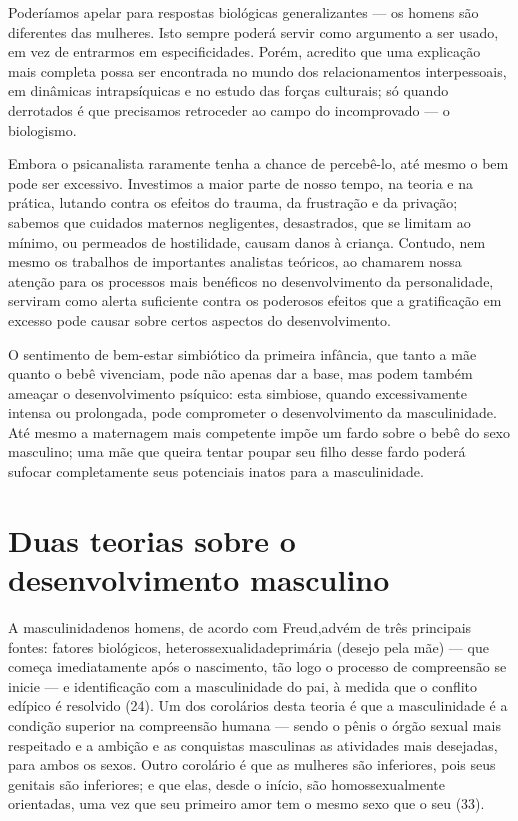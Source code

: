 Poderíamos apelar para respostas biológicas generalizantes --- os
homens são diferentes das mulheres. Isto sempre poderá servir como
argumento a ser usado, em vez de entrarmos em especificidades. Porém,
acredito que uma explicação mais completa possa ser encontrada no mundo
dos relacionamentos interpessoais, em dinâmicas intrapsíquicas e no
estudo das forças culturais; só quando derrotados é que precisamos
retroceder ao campo do incomprovado --- o biologismo.

Embora o psicanalista raramente tenha a chance de percebê-lo, até
mesmo o bem pode ser excessivo. Investimos a maior parte de nosso
tempo, na teoria e na prática, lutando contra os efeitos do trauma, da
frustração e da privação; sabemos que cuidados maternos negligentes,
desastrados, que se limitam ao mínimo, ou permeados de hostilidade,
causam danos à criança. Contudo, nem mesmo os trabalhos de importantes
analistas teóricos, ao chamarem nossa atenção para os processos mais
benéficos no desenvolvimento da personalidade, serviram como alerta
suficiente contra os poderosos efeitos que a gratificação em excesso
pode causar sobre certos aspectos do desenvolvimento.

O sentimento de bem-estar simbiótico da primeira infância, que tanto
a mãe quanto o bebê vivenciam, pode não apenas dar a base, mas podem
também ameaçar o desenvolvimento psíquico: esta simbiose, quando
excessivamente intensa ou prolongada, pode comprometer o
desenvolvimento da masculinidade. Até mesmo a maternagem mais
competente impõe um fardo sobre o bebê do sexo masculino; uma mãe\idxmaes{} que
queira tentar poupar seu filho desse fardo poderá sufocar completamente
seus potenciais inatos para a masculinidade.


\section{Duas teorias sobre o desenvolvimento masculino}

A masculinidade\idxmascu[|(] nos homens, de acordo com Freud,\idxfreudmascu[|(] advém de três
principais fontes: fatores biológicos, heterossexualidade\idxheteroprim[|(] primária
(desejo pela mãe) --- que começa imediatamente após o nascimento, tão
logo o processo de compreensão se inicie --- e identificação\idxident{} com a
masculinidade do pai, à medida que o conflito edípico é resolvido
(24). Um dos corolários desta teoria é que a masculinidade é a condição
superior na compreensão humana --- sendo o pênis o órgão sexual mais
respeitado e a ambição e as conquistas masculinas as atividades mais
desejadas, para ambos os sexos. Outro corolário é que as mulheres são
inferiores, pois seus genitais são inferiores;\idxcondfinfe{} e que elas, desde o
início, são homossexualmente orientadas, uma vez que seu primeiro amor
tem o mesmo sexo que o seu (33).

